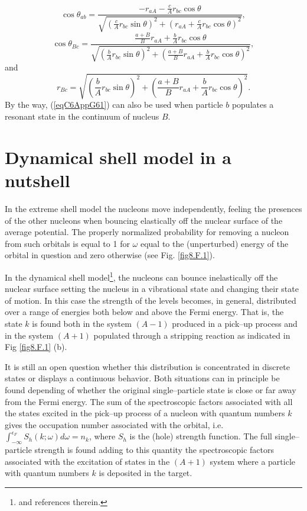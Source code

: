 \begin{subappendices}
\begin{equation}\label{eqC6AppG63}
\cos \theta_{ab}=\frac{-r_{aA}-\frac{c}{A}r_{bc}\cos \theta}{\sqrt{\left(\frac{c}{A}r_{bc}\sin \theta\right)^2+\left(r_{aA}+\frac{c}{A}r_{bc}\cos \theta\right)^2}},
\end{equation}
\begin{equation}\label{eqC6AppG64}
\cos \theta_{Bc}=\frac{\frac{a+B}{B}r_{aA}+\frac{b}{A}r_{bc}\cos \theta}{\sqrt{\left(\frac{b}{A}r_{bc}\sin \theta\right)^2+\left(\frac{a+B}{B}r_{aA}+\frac{b}{A}r_{bc}\cos \theta\right)^2}},
\end{equation}
and
\begin{equation}\label{eqC6AppG65}
r_{Bc}=\sqrt{\left(\frac{b}{A}r_{bc}\sin \theta\right)^2+\left(\frac{a+B}{B}r_{aA}+\frac{b}{A}r_{bc}\cos \theta\right)^2}.
\end{equation}
By the way, (\ref{eqC6AppG61}) can also be used when particle $b$ populates a resonant state in the continuum of nucleus $B$.  

\section{Dynamical shell model in a nutshell}\label{C6AppI}
In the extreme shell model the nucleons move independently, feeling the presences of the other nucleons when bouncing elastically off the nuclear surface of the average potential. The properly normalized probability for removing a nucleon from such orbitals is equal to 1 for $\omega$ equal to the (unperturbed) energy of the orbital in question and zero otherwise (see Fig. \ref{fig8.F.1}).

In the dynamical shell model\footnote{\cite{Mahaux:85} and references therein.}, the nucleons can bounce inelastically off the nuclear surface setting the nucleus in a vibrational state and changing their state of motion. In this case the strength of the levels becomes, in general, distributed over a range of energies both below and above the Fermi energy. That is, the state $k$ is found both in the system $(A-1)$ produced in a pick--up process and in the system $(A+1)$ populated through a stripping reaction as indicated in Fig \ref{fig8.F.1} (b).



It is still an open question whether this distribution is concentrated in discrete states or displays a continuous behavior. Both situations can in principle be found depending of whether the original single--particle state is close or far away from the Fermi energy. The sum of the spectroscopic factors associated with all the states excited in the pick--up process of a nucleon with quantum numbers $k$ gives the occupation number associated with the orbital, i.e. $\int_{-\infty}^{\epsilon_F}S_{h}(k;\omega)d\omega=n_k$, where $S_h$ is the (hole) strength function. The full single--particle strength is found adding to this quantity the spectroscopic factors associated with the excitation of states in the $(A+1)$ system where a particle with quantum numbers $k$ is deposited in the target.




\end{subappendices}
